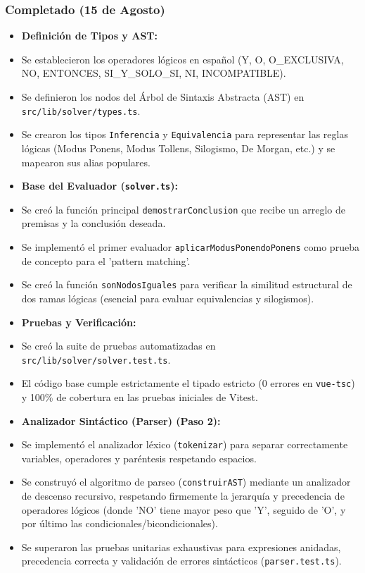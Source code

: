 \documentclass[11pt,a4paper,openany]{book}
\begin{document}
\subsubsection{Completado (15 de Agosto)}
\begin{itemize}[leftmargin=*]
\item \textbf{Definición de Tipos y AST:}
\item Se establecieron los operadores lógicos en español (Y, O, O\_EXCLUSIVA, NO, ENTONCES, SI\_Y\_SOLO\_SI, NI, INCOMPATIBLE).
\item Se definieron los nodos del Árbol de Sintaxis Abstracta (AST) en \texttt{src/lib/solver/types.ts}.
\item Se crearon los tipos \texttt{Inferencia} y \texttt{Equivalencia} para representar las reglas lógicas (Modus Ponens, Modus Tollens, Silogismo, De Morgan, etc.) y se mapearon sus alias populares.
\item \textbf{Base del Evaluador (\texttt{solver.ts}):}
\item Se creó la función principal \texttt{demostrarConclusion} que recibe un arreglo de premisas y la conclusión deseada.
\item Se implementó el primer evaluador \texttt{aplicarModusPonendoPonens} como prueba de concepto para el 'pattern matching'.
\item Se creó la función \texttt{sonNodosIguales} para verificar la similitud estructural de dos ramas lógicas (esencial para evaluar equivalencias y silogismos).
\item \textbf{Pruebas y Verificación:}
\item Se creó la suite de pruebas automatizadas en \texttt{src/lib/solver/solver.test.ts}.
\item El código base cumple estrictamente el tipado estricto (0 errores en \texttt{vue-tsc}) y 100\% de cobertura en las pruebas iniciales de Vitest.
\item \textbf{Analizador Sintáctico (Parser) (Paso 2):}
\item Se implementó el analizador léxico (\texttt{tokenizar}) para separar correctamente variables, operadores y paréntesis respetando espacios.
\item Se construyó el algoritmo de parseo (\texttt{construirAST}) mediante un analizador de descenso recursivo, respetando firmemente la jerarquía y precedencia de operadores lógicos (donde 'NO' tiene mayor peso que 'Y', seguido de 'O', y por último las condicionales/bicondicionales).
\item Se superaron las pruebas unitarias exhaustivas para expresiones anidadas, precedencia correcta y validación de errores sintácticos (\texttt{parser.test.ts}).
\end{itemize}
\end{document}
